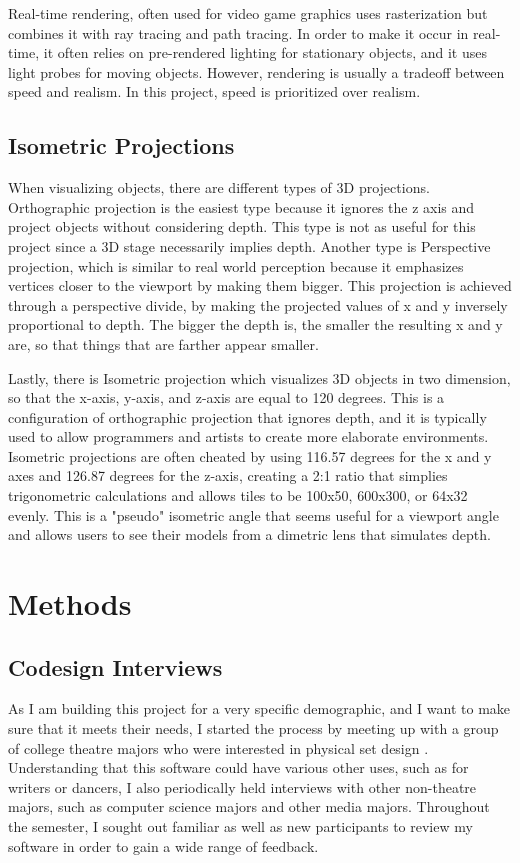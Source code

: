 \documentclass[10pt,twocolumn]{article}
\begin{document}
 Real-time rendering, often used for video game graphics uses rasterization but combines it with ray tracing and path tracing. In order to make it occur in real-time, it often relies on pre-rendered lighting for stationary objects, and it uses light probes for moving objects. However, rendering is usually a tradeoff between speed and realism. In this project, speed is prioritized over realism.

\subsection{Isometric Projections}
When visualizing objects, there are different types of 3D projections. Orthographic projection is the easiest type because it ignores the z axis and project objects without considering depth. This type is not as useful for this project since a 3D stage necessarily implies depth. Another type is Perspective projection, which is similar to real world perception because it emphasizes vertices closer to the viewport by making them bigger. This projection is achieved through a perspective divide, by making the projected values of x and y inversely proportional to depth. The bigger the depth is, the smaller the resulting x and y are, so that things that are farther appear smaller.

Lastly, there is Isometric projection which visualizes 3D objects in two dimension, so that the x-axis, y-axis, and z-axis are equal to 120 degrees. This is a configuration of orthographic projection that ignores depth, and it is typically used to allow programmers and artists to create more elaborate environments. Isometric projections are often cheated by using 116.57 degrees for the x and y axes and 126.87 degrees for the z-axis, creating a 2:1 ratio that simplies trigonometric calculations and allows tiles to be 100x50, 600x300, or 64x32 evenly. This is a "pseudo" isometric angle that seems useful for a viewport angle and allows users to see their models from a dimetric lens that simulates depth.  

\section{Methods}
\subsection{Codesign Interviews}
As I am building this project for a very specific demographic, and I want to make sure that it meets their needs, I started the process by meeting up with a group of college theatre majors who were interested in physical set design . Understanding that this software could have various other uses, such as for writers or dancers, I also periodically held interviews with other non-theatre majors, such as computer science majors and other media majors. Throughout the semester, I sought out familiar as well as new participants to review my software in order to gain a wide range of feedback. 
\end{document}
